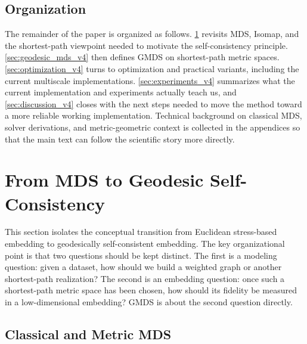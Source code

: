\documentclass[twoside,11pt]{article}
\begin{document}
\subsection{Organization}

The remainder of the paper is organized as follows.
\cref{sec:background_v4} revisits MDS, Isomap, and the shortest-path
viewpoint needed to motivate the self-consistency principle.
\cref{sec:geodesic_mds_v4} then defines GMDS on shortest-path metric spaces.
\cref{sec:optimization_v4} turns to optimization and practical variants,
including the current multiscale implementations.  \cref{sec:experiments_v4}
summarizes what the current implementation and experiments actually teach us,
and \cref{sec:discussion_v4} closes with the next steps needed to move the
method toward a more reliable working implementation.  Technical background on
classical MDS, solver derivations, and metric-geometric context is collected in
the appendices so that the main text can follow the scientific story more
directly.

\section{From MDS to Geodesic Self-Consistency}
\label{sec:background_v4}
\label{sec:background}

This section isolates the conceptual transition from Euclidean stress-based
embedding to geodesically self-consistent embedding.  The key organizational
point is that two questions should be kept distinct.  The first is a modeling
question: given a dataset, how should we build a weighted graph or another
shortest-path realization?  The second is an embedding question: once such a
shortest-path metric space has been chosen, how should its fidelity be measured
in a low-dimensional embedding?  GMDS is about the second question directly.

\subsection{Classical and Metric MDS}
\label{sec:classical_mds}
\label{sec:metric_mds}
\end{document}
